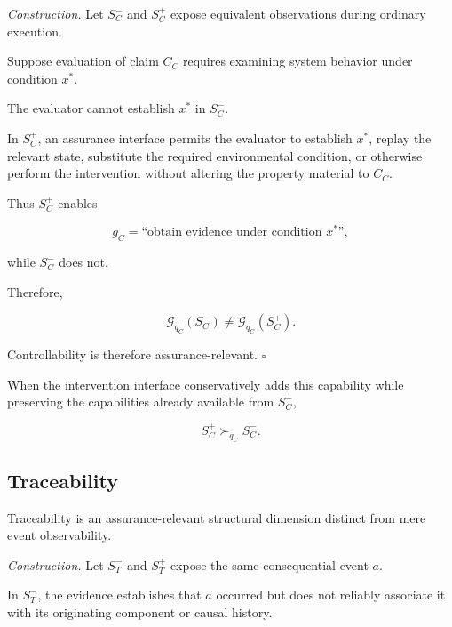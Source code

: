 \textit{Construction.}
Let \(S_C^{-}\) and \(S_C^{+}\) expose equivalent observations during ordinary execution.

Suppose evaluation of claim \(C_C\) requires examining system behavior under condition \(x^\ast\).

The evaluator cannot establish \(x^\ast\) in \(S_C^{-}\).

In \(S_C^{+}\), an assurance interface permits the evaluator to establish \(x^\ast\), replay the relevant state, substitute the required environmental condition, or otherwise perform the intervention without altering the property material to \(C_C\).

Thus \(S_C^{+}\) enables

\begin{equation}
  g_C
  =
  \text{``obtain evidence under condition }x^\ast\text{''},
\end{equation}

while \(S_C^{-}\) does not.

Therefore,

\begin{equation}
  \mathcal{G}_{q_C}(S_C^{-})
  \neq
  \mathcal{G}_{q_C}(S_C^{+}).
\end{equation}

Controllability is therefore assurance-relevant.
\hfill\(\square\)

When the intervention interface conservatively adds this capability while preserving the capabilities already available from \(S_C^{-}\),

\begin{equation}
  S_C^{+}
  \succ_{q_C}
  S_C^{-}.
\end{equation}

\subsection{Traceability}
\label{aa.subsec.traceability-contribution}

\begin{proposition}
  \label{se320.prop.TraceabilityContribution}
  Traceability is an assurance-relevant structural dimension
  distinct from mere event observability.
\end{proposition}

\textit{Construction.}
Let \(S_T^{-}\) and \(S_T^{+}\) expose the same consequential event \(a\).

In \(S_T^{-}\), the evidence establishes that \(a\) occurred but does not reliably associate it with its originating component or causal history.

